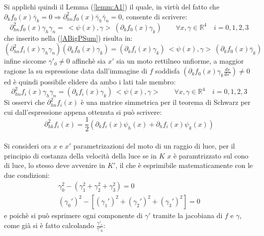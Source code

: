Si applichi quindi il Lemma (\ref{lemm:A1}) il quale, in virtù del fatto che $\partial_kf_0(x)\bar{\gamma}_k=0\Rightarrow 
\partial^2_{hn}f_0(x)\bar{\gamma}_h\bar{\gamma}_n=0$, consente di scrivere:
\begin{equation*}
    \partial^2_{hn}f_0(x)\gamma_h\gamma_n=\ <\psi(x),\gamma>\ (\partial_kf_0(x)\gamma_k) \qquad   \forall x,\gamma\in \mathbb{R}^4 \quad i=0,1,2,3  
\end{equation*}
che inserito nella (\ref{ABigPSum}) risulta in:
\begin{equation*}
    \left(\partial^2_{hn}f_i(x)\gamma_h\gamma_n\right)\left(\partial_kf_0(x)\gamma_k\right)
    = \left(\partial_kf_i(x)\gamma_k\right)\ <\psi(x),\gamma>\ (\partial_kf_0(x)\bar{\gamma}_k)
\end{equation*}
infine siccome $\gamma'_0\neq 0$ affinchè sia $x'$ sia un moto rettilneo unfiorme, a maggior ragione la su espressione data dall'immagine di $f$ soddisfa $(\partial_kf_0(x)\gamma_k\frac{ds}{ds'})\neq 0$ 
ed è quindi possibile elidere da ambo i lati tale membro:
\begin{equation}
    \partial^2_{hn}f_i(x)\gamma_h\gamma_n=\left(\partial_kf_i(x)\gamma_k\right)\ <\psi(x),\gamma> \qquad   \forall x,\gamma\in \mathbb{R}^4 \quad i=0,1,2,3
    \label{APArtialScal}
\end{equation}
Si osservi che  $\partial^2_{hn}f_i(x)$ è una matrice simmetrica per il teorema di Schwarz per cui dall'espressione appena ottenuta si può scrivere:
\begin{equation}
    \partial^2_{hk}f_i(x)=\frac{1}{2}\left(\partial_kf_i(x)\psi_h(x)+\partial_hf_i(x)\psi_k(x)\right)
    \label{APArtialScalSimm}
\end{equation}
\\
Si consideri ora $x$ e $x'$ parametrizazioni del moto di un raggio di luce, per il principio di costanza della velocità della luce 
se in $K$ $x$ è paramtrizzato sul cono di luce, lo stesso deve avvenire in $K'$, il che è esprimibile matematicamente con le due condizioni:
\begin{equation*}
    \begin{gathered}
        \gamma_0^2-(\gamma_1^2+\gamma_2^2+\gamma_3^2)=0\\
        (\gamma_0')^2-[(\gamma_1')^2+(\gamma_2')^2+(\gamma_3')^2]=0
    \end{gathered}
\end{equation*}
e poichè si può esprimere ogni componente di $\gamma'$ tramite la jacobiana di $f$ e $\gamma$, come già 
si è fatto calcolando $\frac{\gamma'_i}{\gamma'_0}$:
